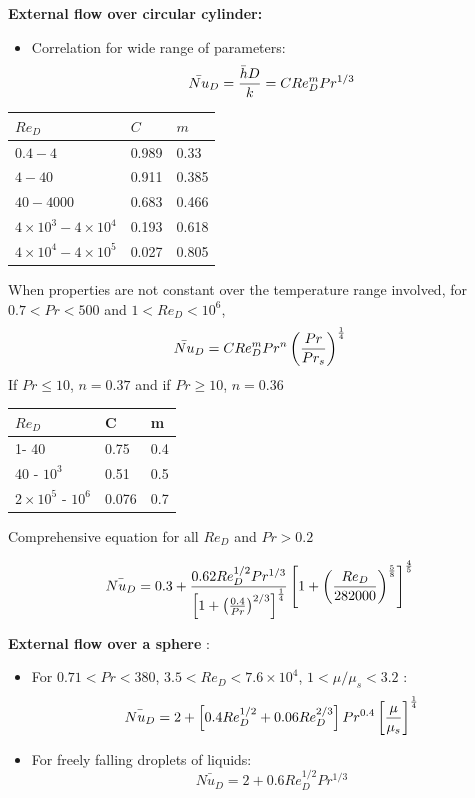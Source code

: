 {\bf External flow over circular cylinder:}

\begin{itemize}
\item Correlation for wide range of parameters:
$$ \bar{Nu}_D = { \bar{h} D \over k} = C Re_D^m Pr^{1/3} $$
\end{itemize}


\begin{center}
 
\begin{tabular}{lll}
\hline
 $Re_D$ & $C$ & $m$ \\
\hline
$0.4 - 4$ & 0.989 & 0.33 \\
$4 - 40$ & 0.911 & 0.385 \\
$40 - 4000$ & 0.683 & 0.466 \\
$4\times 10^3 - 4\times 10^4$  & 0.193 & 0.618 \\
$4 \times 10^4 - 4\times 10^5 $ & 0.027 & 0.805 \\
\hline
\end{tabular}

\end{center}


\vspace{5 mm}
When properties are not constant over the temperature range involved, for $0.7 < Pr < 500$ and $1 < Re_D < 10^6$,
$$\bar{Nu}_D = C Re_D^m Pr^n \left( {Pr \over Pr_s} \right)^{1 \over 4}$$
If $Pr \le 10$, $n=0.37$ and if $Pr \ge 10$, $n=0.36$

\begin{center}
 
\begin{tabular}{l l l}
\hline
$Re_D$ & C & m \\
\hline
1- 40 & 0.75 & 0.4 \\
40 - $10^3$ & 0.51 & 0.5 \\
$2 \times 10^5$ - $10^6$ & 0.076 & 0.7 \\
\hline
\end{tabular}

\end{center}


Comprehensive equation for all $Re_D$ and $Pr > 0.2$ 

$$ \bar{Nu_D} = 0.3 + {0.62 Re_D^{1/2} Pr^{1/3} \over \left[ 1 + \left( 0.4 \over Pr \right)^{2/3} \right]^{1 \over 4} } \left[ 1 + \left( Re_D \over 282000 \right)^{5 \over 8} \right]^{4 \over 5}  $$

\pagebreak


{\bf External flow over a sphere} :
\begin{itemize}
 \item  For $0.71 < Pr < 380$, $3.5 < Re_D < 7.6 \times 10^4$, $1 < {\mu / \mu_s} < 3.2 $ :
      $$ \bar{Nu_D} = 2 + \left[ 0.4 Re_D^{1/2} + 0.06 Re_D^{2/3} \right] Pr^{0.4} \left[ \mu \over \mu_s \right]^{1 \over 4} $$
\item For freely falling droplets of liquids:
      $$ \bar{Nu_D} = 2 + 0.6 Re_D^{1/2} Pr^{1/3} $$
\end{itemize}


